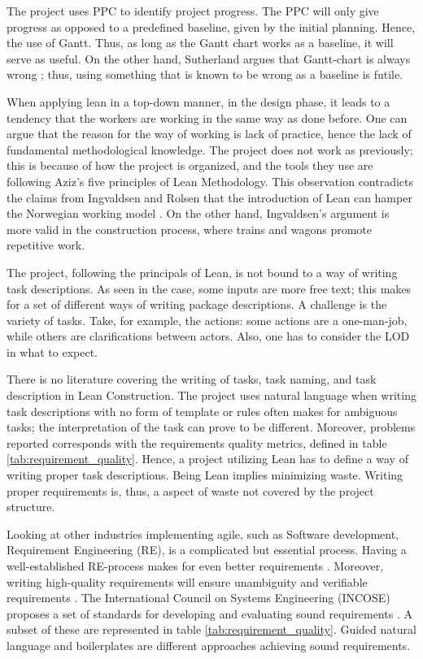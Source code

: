 The project uses PPC to identify project progress. The PPC will only give progress as opposed to a predefined baseline, given by the initial planning. Hence, the use of Gantt. Thus, as long as the Gantt chart works as a baseline, it will serve as useful. On the other hand, Sutherland argues that Gantt-chart is always wrong \cite{sutherland}; thus, using something that is known to be wrong as a baseline is futile. 
    
When applying lean in a top-down manner, in the design phase, it leads to a tendency that the workers are working in the same way as done before. One can argue that the reason for the way of working is lack of practice, hence the lack of fundamental methodological knowledge. The project does not work as previously; this is because of how the project is organized, and the tools they use are following Aziz's five principles of Lean Methodology. This observation contradicts the claims from Ingvaldsen and Rolsen that the introduction of Lean can hamper the Norwegian working model \cite{ingvaldsen2012lean}. On the other hand, Ingvaldsen's argument is more valid in the construction process, where trains and wagons promote repetitive work.

The project, following the principals of Lean, is not bound to a way of writing task descriptions. As seen in the case, some inputs are more free text; this makes for a set of different ways of writing package descriptions. A challenge is the variety of tasks. Take, for example, the actions: some actions are a one-man-job, while others are clarifications between actors. Also, one has to consider the LOD in what to expect. 

There is no literature covering the writing of tasks, task naming, and task description in Lean Construction. The project uses natural language when writing task descriptions with no form of template or rules often makes for ambiguous tasks; the interpretation of the task can prove to be different. Moreover, problems reported corresponds with the requirements quality metrics, defined in table \ref{tab:requirement_quality}. Hence, a project utilizing Lean has to define a way of writing proper task descriptions. Being Lean implies minimizing waste. Writing proper requirements is, thus, a aspect of waste not covered by the project structure.

Looking at other industries implementing agile, such as Software development, Requirement Engineering (RE), is a complicated but essential process. Having a well-established RE-process makes for even better requirements \cite{pandey2010effective}. Moreover, writing high-quality requirements will ensure unambiguity and verifiable requirements \cite{carson2015implementing}. The International Council on Systems Engineering (INCOSE) proposes a set of standards for developing and evaluating sound requirements \cite{incose2015guide}. A subset of these are represented in table \ref{tab:requirement_quality}. Guided natural language \cite{rolland1992natural} and boilerplates \cite{daramola2012pattern} are different approaches achieving sound requirements.

